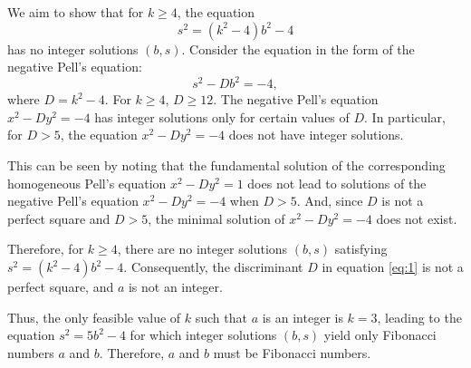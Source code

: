 \documentclass[10pt]{article}
\theoremstyle{plain}
\theoremstyle{definition}
\theoremstyle{remark}
\begin{document}
We aim to show that for \(k \geq 4\), the equation
\[
s^2 = (k^2 - 4)b^2 - 4
\]
has no integer solutions \((b, s)\). Consider the equation in the form of the negative Pell's equation:
\[
s^2 - D b^2 = -4,
\]
where \(D = k^2 - 4\). For \(k \geq 4\), \(D \geq 12\). The negative Pell's equation \(x^2 - D y^2 = -4\) has integer solutions only for certain values of \(D\). In particular, for \(D > 5\), the equation \(x^2 - D y^2 = -4\) does not have integer solutions.

This can be seen by noting that the fundamental solution of the corresponding homogeneous Pell's equation \(x^2 - D y^2 = 1\) does not lead to solutions of the negative Pell's equation \(x^2 - D y^2 = -4\) when \(D > 5\). And, since \(D\) is not a perfect square and \(D > 5\), the minimal solution of \(x^2 - D y^2 = -4\) does not exist.

Therefore, for \(k \geq 4\), there are no integer solutions \((b, s)\) satisfying \(s^2 = (k^2 - 4)b^2 - 4\). Consequently, the discriminant \(D\) in equation \ref{eq:1} is not a perfect square, and \(a\) is not an integer.

Thus, the only feasible value of \(k\) such that \(a\) is an integer is \(k = 3\), leading to the equation \(s^2 = 5b^2 - 4\) for which integer solutions \((b, s)\) yield only Fibonacci numbers \(a\) and \(b\). Therefore, \(a\) and \(b\) must be Fibonacci numbers.
\end{document}
